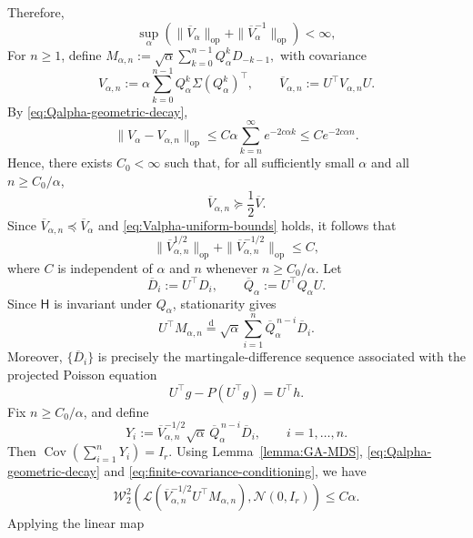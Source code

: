 \documentclass[11pt,letterpaper]{article}
\theoremstyle{plain}
\theoremstyle{definition}
\theoremstyle{remark}
\newcommand{\W}{\mathcal{W}}
\newcommand{\law}{\mathcal{L}}
\begin{document}
Therefore,
\begin{equation}
\label{eq:Valpha-uniform-bounds}
    \sup_{\alpha}
    \left(
        \|\overline V_\alpha\|_{\mathrm{op}}
        +
        \|\overline V_\alpha^{-1}\|_{\mathrm{op}}
    \right)
    <\infty,
\end{equation}
For \(n\geq1\), define $M_{\alpha,n}
    :=
    \sqrt{\alpha}
    \sum_{k=0}^{n-1}
    Q_\alpha^kD_{-k-1},$ with covariance
\[
    V_{\alpha,n}
    :=
    \alpha
    \sum_{k=0}^{n-1}
    Q_\alpha^k\Sigma(Q_\alpha^k)^\top,
    \qquad
    \overline V_{\alpha,n}
    :=
    U^\top V_{\alpha,n}U.
\]
By \eqref{eq:Qalpha-geometric-decay},
\[
    \|V_\alpha-V_{\alpha,n}\|_{\mathrm{op}}
    \leq
    C\alpha
    \sum_{k=n}^{\infty}e^{-2c\alpha k}
    \leq
    Ce^{-2c\alpha n}.
\]
Hence, there exists \(C_0<\infty\) such that, for all sufficiently small
\(\alpha\) and all \(n\geq C_0/\alpha\),
\begin{equation}
\label{eq:finite-covariance-conditioning}
    \overline V_{\alpha,n}
    \succeq
    \frac12\overline V.
\end{equation}
Since $\overline V_{\alpha,n}
    \preceq
    \overline V_\alpha$ and \eqref{eq:Valpha-uniform-bounds} holds, it follows that
\[
    \|\overline V_{\alpha,n}^{1/2}\|_{\mathrm{op}}
    +
    \|\overline V_{\alpha,n}^{-1/2}\|_{\mathrm{op}}
    \leq C,
\]
where \(C\) is independent of \(\alpha\) and \(n\) whenever
\(n\geq C_0/\alpha\). Let
\[
    \overline D_i:=U^\top D_i,
    \qquad
    \overline Q_\alpha:=U^\top Q_\alpha U.
\]
Since \(\mathsf H\) is invariant under \(Q_\alpha\), stationarity gives
\[
    U^\top M_{\alpha,n}
    \overset{\mathrm d}{=}
    \sqrt{\alpha}
    \sum_{i=1}^n
    \overline Q_\alpha^{\,n-i}\overline D_i.
\]
Moreover, \(\{\overline D_i\}\) is precisely the martingale-difference
sequence associated with the projected Poisson equation
\[
    U^\top g-P(U^\top g)=U^\top h.
\]
Fix \(n\geq C_0/\alpha\), and define
\[
    Y_i
    :=
    \overline V_{\alpha,n}^{-1/2}
    \sqrt{\alpha}\,
    \overline Q_\alpha^{\,n-i}\overline D_i,
    \qquad
    i=1,\ldots,n.
\]
Then $\operatorname{Cov}\left(\sum_{i=1}^nY_i\right)
    =
    I_r.$ Using Lemma~\ref{lemma:GA-MDS}, \eqref{eq:Qalpha-geometric-decay} and
\eqref{eq:finite-covariance-conditioning}, we have
\begin{align*}
    \W_2^2\left(
        \law\left(
            \overline V_{\alpha,n}^{-1/2}
            U^\top M_{\alpha,n}
        \right),
        \mathcal N(0,I_r)
    \right)
    \leq C\alpha.
\end{align*}
Applying the linear map
\end{document}
